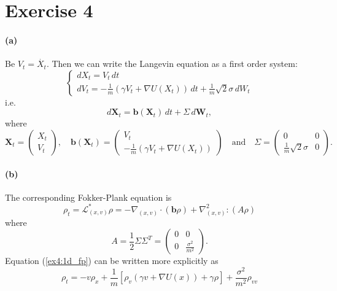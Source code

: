 \documentclass[a4paper,11pt]{article}
\theoremstyle{definition}
\theoremstyle{plain}
\theoremstyle{remark}
\begin{document}
\section*{Exercise 4}

\paragraph*{(a)}

Be $V_t = \dot{X_t}$. Then we can write the Langevin equation as a first order system:
$$
\begin{cases} dX_t = V_t\,dt \\ dV_t = -\frac{1}{m}(\gamma V_t + \nabla U(X_t))\,dt + \frac{1}{m}\sqrt{2}\sigma\,dW_t \end{cases}
$$
i.e.
$$
d\mathbf{X}_t = \mathbf{b}(\mathbf{X}_t)\,dt + \Sigma\,d\mathbf{W}_t,
$$
where
$$
\mathbf{X}_t = \left(\begin{matrix}
X_t \\ V_t
\end{matrix}\right), \quad \mathbf{b}(\mathbf{X}_t) = \left(\begin{matrix}
V_t \\ -\frac{1}{m}(\gamma V_t + \nabla U(X_t))
\end{matrix}\right) \quad \text{and} \quad \Sigma = \left(\begin{matrix}
0 & 0 \\ \frac{1}{m}\sqrt{2}\sigma & 0
\end{matrix}\right).
$$

\paragraph*{(b)}

The corresponding Fokker-Plank equation is
\begin{equation}
\rho_t = \mathcal{L}^*_{(x,v)} \rho = -\nabla_{(x,v)} \cdot (\mathbf{b}\rho) + \nabla^2_{(x,v)}:(A\rho)\label{ex4:1d_fp}
\end{equation}
where
$$
A = \frac{1}{2}\Sigma\Sigma^T = \left(\begin{matrix}
0 & 0 \\ 0 & \frac{\sigma^2}{m^2}
\end{matrix}\right).
$$
Equation (\ref{ex4:1d_fp}) can be written more explicitly as
\begin{equation}
\rho_t = -v\rho_x + \frac{1}{m}[\rho_v(\gamma v + \nabla U(x))+ \gamma\rho] + \frac{\sigma^2}{m^2}\rho_{vv}
\label{ex4:1d_fp:2}
\end{equation}
\end{document}

